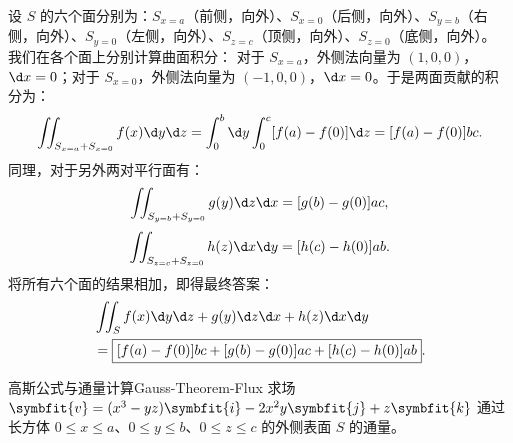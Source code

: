 \begin{solution}
    设 $S$ 的六个面分别为：$S_{x=a}$（前侧，向外）、$S_{x=0}$（后侧，向外）、$S_{y=b}$（右侧，向外）、$S_{y=0}$（左侧，向外）、$S_{z=c}$（顶侧，向外）、$S_{z=0}$（底侧，向外）。
    我们在各个面上分别计算曲面积分：
    对于 $S_{x=a}$，外侧法向量为 $(1, 0, 0)$，$\d x = 0$；对于 $S_{x=0}$，外侧法向量为 $(-1, 0, 0)$，$\d x = 0$。于是两面贡献的积分为：
    \begin{equation}
        \label{eq:box-1}
        \iint_{S_{x=a} + S_{x=0}} f(x) \d y \d z = \int_0^b \d y \int_0^c [f(a) - f(0)] \d z = [f(a) - f(0)] b c.
    \end{equation}
    同理，对于另外两对平行面有：
    \begin{equation}
        \label{eq:box-2}
        \iint_{S_{y=b} + S_{y=0}} g(y) \d z \d x = [g(b) - g(0)] a c,
    \end{equation}
    \begin{equation}
        \label{eq:box-3}
        \iint_{S_{z=c} + S_{z=0}} h(z) \d x \d y = [h(c) - h(0)] a b.
    \end{equation}
    将所有六个面的结果相加，即得最终答案：
    \begin{equation}
        \label{eq:box-4}
        \begin{aligned}
             & \iint_{S} f(x) \d y \d z + g(y) \d z \d x + h(z) \d x \d y           \\
             & = \boxed{[f(a) - f(0)] b c + [g(b) - g(0)] a c + [h(c) - h(0)] a b}.
        \end{aligned}
    \end{equation}
\end{solution}

\begin{problem}{高斯公式与通量计算}{Gauss-Theorem-Flux}
    求场 $\symbfit{v} = (x^3 - yz)\symbfit{i} - 2x^2y\symbfit{j} + z\symbfit{k}$ 通过长方体 $0 \le x \le a$、$0 \le y \le b$、$0 \le z \le c$ 的外侧表面 $S$ 的通量。
\end{problem}

